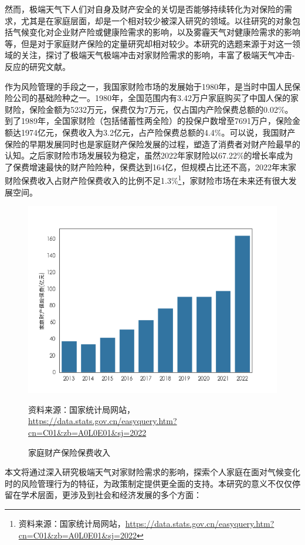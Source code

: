 然而，极端天气下人们对自身及财产安全的关切是否能够持续转化为对保险的需求，尤其是在家庭层面，却是一个相对较少被深入研究的领域。以往研究的对象包括气候变化对企业财产险\citep{杨娜娜2019自然灾害与企业现金持有}或健康险\citep{赵强2021空气污染对商业健康保险需求的影响}需求的影响，以及雾霾天气对健康险需求的影响\citep{2018Something}等，但是对于家庭财产保险的定量研究却相对较少。本研究的选题来源于对这一领域的关注，探讨了极端天气极端冲击对家财险需求的影响，丰富了极端天气冲击-反应的研究文献。

作为风险管理的手段之一，我国家财险市场的发展始于1980年，是当时中国人民保险公司的基础险种之一。1980年，全国范围内有3.42万户家庭购买了中国人保的家财险，保险金额为5232万元，保费仅为7万元，仅占国内产险保费总额的0.02\%。到了1989年，全国家财险（包括储蓄性两全险）的投保户数增至7691万户，保险金额达1974亿元，保费收入为3.2亿元，占产险保费总额的4.4\%。可以说，我国财产保险的早期发展同时也是家庭财产保险发展的过程\citep{黄英君2008论我国产险公司分散性业务营销模式的创新}，塑造了消费者对财产险最早的认知。之后家财险市场发展较为稳定，虽然2022年家财险以67.22\%的增长率成为了保费增速最快的财产险险种，保费达到164亿，但规模占比还不高，2022年末家财险保费收入占财产险保费收入的比例不足1.3\%\footnote{资料来源：国家统计局网站，\url{https://data.stats.gov.cn/easyquery.htm?cn=C01&zb=A0L0E01&sj=2022}}，家财险市场在未来还有很大发展空间。
\begin{figure}[htbp]
    {\centering
        \includegraphics[width=0.8\linewidth]{img/家庭财产保险保费.png}\par }
    \caption{家庭财产保险保费收入}
    \qquad {} 资料来源：国家统计局网站，\url{https://data.stats.gov.cn/easyquery.htm?cn=C01&zb=A0L0E01&sj=2022}
\end{figure}


本文将通过深入研究极端天气对家财险需求的影响，探索个人家庭在面对气候变化时的风险管理行为的特征，为政策制定提供更全面的支持。本研究的意义不仅仅停留在学术层面，更涉及到社会和经济发展的多个方面：

